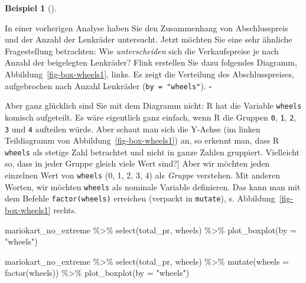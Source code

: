 \documentclass[
  letterpaper,
]{scrbook}
\newenvironment{Shaded}{\begin{snugshade}}{\end{snugshade}}
\newcommand{\AttributeTok}[1]{\textcolor[rgb]{0.40,0.45,0.13}{#1}}
\newcommand{\FunctionTok}[1]{\textcolor[rgb]{0.28,0.35,0.67}{#1}}
\newcommand{\NormalTok}[1]{\textcolor[rgb]{0.00,0.23,0.31}{#1}}
\newcommand{\SpecialCharTok}[1]{\textcolor[rgb]{0.37,0.37,0.37}{#1}}
\newcommand{\StringTok}[1]{\textcolor[rgb]{0.13,0.47,0.30}{#1}}
\theoremstyle{definition}
\theoremstyle{definition}
\newtheorem{example}{Beispiel}[chapter]
\theoremstyle{definition}
\theoremstyle{remark}
\begin{document}
\begin{example}[]\protect\hypertarget{exm-Boxplots}{}\label{exm-Boxplots}

In einer vorherigen Analyse haben Sie den Zusammenhang von
Abschlusspreis und der Anzahl der Lenkräder untersucht. Jetzt möchten
Sie eine sehr ähnliche Fragestellung betrachten: Wie
\emph{unterscheiden} sich die Verkaufspreise je nach Anzahl der
beigelegten Lenkräder? Flink erstellen Sie dazu folgendes Diagramm,
Abbildung~\ref{fig-box-wheels1}, links. Es zeigt die Verteilung des
Abschlusspreises, aufgebrochen nach Anzahl Lenkräder
(\texttt{by\ =\ "wheels"}). \(\square\)

\end{example}

Aber ganz glücklich sind Sie mit dem Diagramm nicht: R hat die Variable
\texttt{wheels} komisch aufgeteilt. Es wäre eigentlich ganz einfach,
wenn R die Gruppen \texttt{0}, \texttt{1}, \texttt{2}, \texttt{3} und
\texttt{4} aufteilen würde. Aber schaut man sich die Y-Achse (im linken
Teildiagramm von Abbildung~\ref{fig-box-wheels1}) an, so erkennt man,
dass R \texttt{wheels} als stetige Zahl betrachtet und nicht in ganze
Zahlen gruppiert. Vielleicht so, dass in jeder Gruppe gleich viele Wert
sind?{]} Aber wir möchten jeden einzelnen Wert von \texttt{wheels} (0,
1, 2, 3, 4) als \emph{Gruppe} verstehen. Mit anderen Worten, wir möchten
\texttt{wheels} als nominale Variable definieren. Das kann man mit dem
Befehle \texttt{factor(wheels)} erreichen (verpackt in \texttt{mutate}),
s. Abbildung~\ref{fig-box-wheels1} rechts.

\begin{Shaded}
\begin{Highlighting}[]
\NormalTok{mariokart\_no\_extreme }\SpecialCharTok{\%\textgreater{}\%} 
  \FunctionTok{select}\NormalTok{(total\_pr, wheels) }\SpecialCharTok{\%\textgreater{}\%} 
  \FunctionTok{plot\_boxplot}\NormalTok{(}\AttributeTok{by =} \StringTok{"wheels"}\NormalTok{)}

\NormalTok{mariokart\_no\_extreme }\SpecialCharTok{\%\textgreater{}\%} 
  \FunctionTok{select}\NormalTok{(total\_pr, wheels) }\SpecialCharTok{\%\textgreater{}\%} 
  \FunctionTok{mutate}\NormalTok{(}\AttributeTok{wheels =} \FunctionTok{factor}\NormalTok{(wheels)) }\SpecialCharTok{\%\textgreater{}\%} 
  \FunctionTok{plot\_boxplot}\NormalTok{(}\AttributeTok{by =} \StringTok{"wheels"}\NormalTok{)}
\end{Highlighting}
\end{Shaded}
\end{document}
